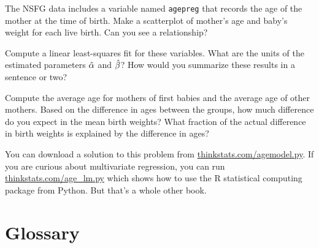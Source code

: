 \documentclass[12pt]{book}
\begin{document}
\begin{exercise}
The NSFG data includes a variable named {\tt agepreg} that records
the age of the mother at the time of birth.
Make a scatterplot of mother's age and baby's weight for each live
birth.  Can you see a relationship?

Compute a linear least-squares fit for these variables.  What are the
units of the estimated parameters $\hat{\alpha}$ and $\hat{\beta}$?
How would you summarize these results in a sentence or two?

Compute the average age for mothers of first babies and the average
age of other mothers.  Based on the difference in ages between the
groups, how much difference do you expect in the mean birth weights?
What fraction of the actual difference in birth weights is explained
by the difference in ages?

You can download a solution to this problem from
\url{thinkstats.com/agemodel.py}.  If you are curious about
multivariate regression, you can run \url{thinkstats.com/age_lm.py}
which shows how to use the R statistical computing package from
Python.  But that's a whole other book.

\end{exercise}


\section{Glossary}
\end{document}

